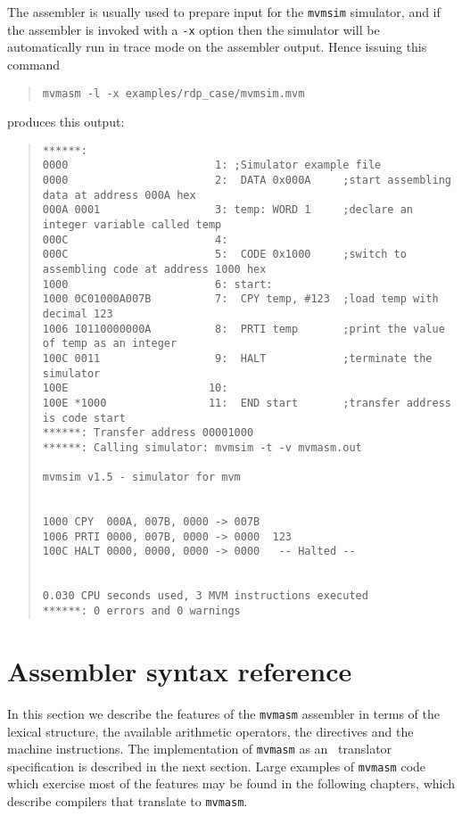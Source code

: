 The assembler is usually used to prepare input for the {\tt mvmsim}
simulator, and if the assembler is invoked with a {\tt -x} option
then the simulator will be automatically run in trace mode on the assembler
output. Hence issuing this command
\begin{quote}
\verb+mvmasm -l -x examples/rdp_case/mvmsim.mvm+
\end{quote}
produces this output:
\begin{quote}
\hspace*{-1cm}
\begin{minipage}{30cm}
\footnotesize
\begin{verbatim}
******: 
0000                       1: ;Simulator example file
0000                       2:  DATA 0x000A     ;start assembling data at address 000A hex
000A 0001                  3: temp: WORD 1     ;declare an integer variable called temp
000C                       4: 
000C                       5:  CODE 0x1000     ;switch to assembling code at address 1000 hex
1000                       6: start:
1000 0C01000A007B          7:  CPY temp, #123  ;load temp with decimal 123
1006 10110000000A          8:  PRTI temp       ;print the value of temp as an integer
100C 0011                  9:  HALT            ;terminate the simulator
100E                      10: 
100E *1000                11:  END start       ;transfer address is code start
******: Transfer address 00001000
******: Calling simulator: mvmsim -t -v mvmasm.out 

mvmsim v1.5 - simulator for mvm


1000 CPY  000A, 007B, 0000 -> 007B  
1006 PRTI 0000, 007B, 0000 -> 0000  123
100C HALT 0000, 0000, 0000 -> 0000   -- Halted --


0.030 CPU seconds used, 3 MVM instructions executed
******: 0 errors and 0 warnings
\end{verbatim}
\end{minipage}
\end{quote}

\section{Assembler syntax reference}

In this section we describe the features of the {\tt mvmasm}
assembler in terms of the lexical structure, the available arithmetic
operators, the directives and the machine instructions. The
implementation of {\tt mvmasm} as an \rdp\ translator specification is
described in the next section. Large examples of {\tt mvmasm} code
which exercise most of the features may be found in the following chapters,
which describe compilers that translate to {\tt mvmasm}.

